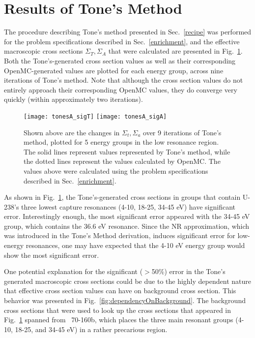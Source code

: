 \documentclass[10pt]{article}
\begin{document}
  \section{Results of Tone's Method}\label{sec:results}
  The procedure describing Tone's method presented in Sec.~\ref{recipe} was performed for the problem specifications described in Sec.~\ref{enrichment}, and the effective macroscopic cross sections $\Sigma_T,\Sigma_A$ that were calculated are presented in Fig.~\ref{fig:results1}. Both the Tone's-generated cross section values as well as their corresponding OpenMC-generated values are plotted for each energy group, across nine iterations of Tone's method. Note that although the cross section values do not entirely approach their corresponding OpenMC values, they do converge very quickly (within approximately two iterations). %
  \begin{figure}[H]
    \begin{center}
    \texttt{[image: tonesA\_sigT]}
    \texttt{[image: tonesA\_sigA]}
      \caption{Shown above are the changes in $\Sigma_t,\Sigma_a$ over 9 iterations of Tone's method, plotted for 5 energy groups in the low resonance region. The solid lines represent values represented by Tone's method, while the dotted lines represent the values calculated by OpenMC. The values above were calculated using the problem specifications described in Sec.~\ref{enrichment}.}
      \label{fig:results1}
    \end{center}
  \end{figure}
As shown in Fig.~\ref{fig:results1}, the Tone's-generated cross sections in groups that contain U-238's three lowest capture resonances (4-10, 18-25, 34-45 eV) have significant error. Interestingly enough, the most significant error appeared with the 34-45 eV group, which contains the 36.6 eV resonance. Since the NR approximation, which was introduced in the Tone's Method derivation, induces significant error for low-energy resonances, one may have expected that the 4-10 eV energy group would show the most significant error. \par
One potential explanation for the significant ($>$50\%) error in the Tone's generated macroscopic cross sections could be due to the highly dependent nature that effective cross section values can have on background cross section. This behavior was presented in Fig.~\ref{fig:dependencyOnBackground}. The background cross sections that were used to look up the cross sections that appeared in Fig.~\ref{fig:results1} spanned from ~70-160b, which places the three main resonant groups (4-10, 18-25, and 34-45 eV) in a rather precarious region.
\end{document}
